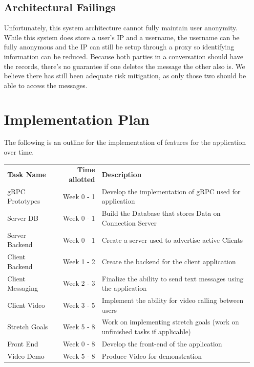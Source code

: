 \documentclass[titlepage]{article}
\begin{document}
      \subsection{Architectural Failings}

      Unfortunately, this system architecture cannot fully maintain user anonymity.
      While this system does store a user's IP and a username, the username can be fully anonymous and the IP can still be setup through a proxy so identifying information can be reduced.
      Because both parties in a conversation should have the records, there's no guarantee if one deletes the message the other also is.
      We believe there has still been adequate risk mitigation, as only those two should be able to access the messages.

    \section{Implementation Plan}
    
    The following is an outline for the implementation of features for the application over time. \\

	\begin{tabular}{l r l}
		\textbf{Task Name}	& \textbf{Time allotted} & \textbf{Description}\\
		gRPC Prototypes		& Week 0 - 1 & Develop the implementation of gRPC used for application\\
		Server DB  			& Week 0 - 1 & Build the Database that stores Data on Connection Server\\
		Server Backend 		& Week 0 - 1 & Create a server used to advertise active Clients\\
		Client Backend 		& Week 1 - 2 & Create the backend for the client application\\
		Client Messaging 	& Week 2 - 3 & Finalize the ability to send text messages using the application\\
		Client Video 		& Week 3 - 5 & Implement the ability for video calling between users\\
		Stretch Goals 		& Week 5 - 8 & Work on implementing stretch goals (work on unfinished tasks if applicable)\\
		Front End  			& Week 0 - 8 & Develop the front-end of the application\\
		Video Demo	 		& Week 5 - 8 & Produce Video for demonstration \\	
	\end{tabular}
\end{document}
